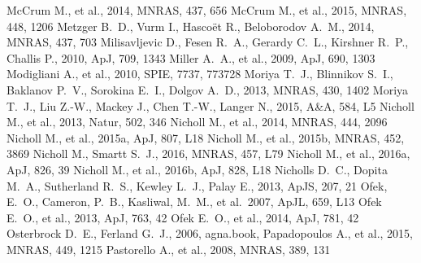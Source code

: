 \documentclass[useAMS,usenatbib]{mn2e}
\begin{document}
\begin{thebibliography}{99}
 McCrum M., et al., 2014, MNRAS, 437, 656 
 McCrum M., et al., 2015, MNRAS, 448, 1206
 Metzger B.~D., Vurm I., Hasco{\"e}t R., Beloborodov A.~M., 2014, MNRAS, 437, 703 
 Milisavljevic D., Fesen R.~A., Gerardy C.~L., Kirshner R.~P., Challis P., 2010, ApJ, 709, 1343 
 Miller A.~A., et al., 2009, ApJ, 690, 1303 
 Modigliani A., et al., 2010, SPIE, 7737, 773728 
 Moriya T.~J., Blinnikov S.~I., Baklanov P.~V., Sorokina E.~I., Dolgov A.~D., 2013, MNRAS, 430, 1402 
 Moriya T.~J., Liu Z.-W., Mackey J., Chen T.-W., Langer N., 2015, A\&A, 584, L5 
 Nicholl M., et al., 2013, Natur, 502, 346 
 Nicholl M., et al., 2014, MNRAS, 444, 2096
 Nicholl M., et al., 2015a, ApJ, 807, L18 
 Nicholl M., et al., 2015b, MNRAS, 452, 3869
 Nicholl M., Smartt S.~J., 2016, MNRAS, 457, L79 
 Nicholl M., et al., 2016a, ApJ, 826, 39 
 Nicholl M., et al., 2016b, ApJ, 828, L18 
 Nicholls D.~C., Dopita M.~A., Sutherland R.~S., Kewley L.~J., Palay E., 2013, ApJS, 207, 21 
 Ofek, E.~O., Cameron, 
P.~B., Kasliwal, M.~M., et al.\ 2007, ApJL, 659, L13
 Ofek E.~O., et al., 2013, ApJ, 763, 42 
 Ofek E.~O., et al., 2014, ApJ, 781, 42 
 Osterbrock D.~E., Ferland G.~J., 2006, agna.book,
 Papadopoulos A., et al., 2015, MNRAS, 449, 1215 
 Pastorello A., et al., 2008, MNRAS, 389, 131 

\end{thebibliography}
\end{document}
